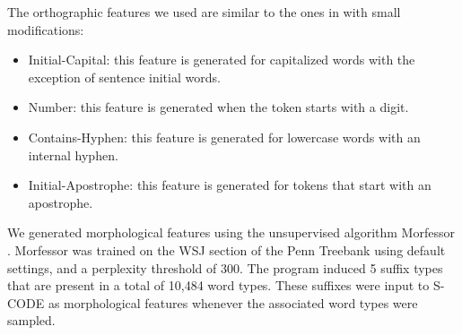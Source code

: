 \documentclass[11pt]{article}
\begin{document}




The orthographic features we used are similar to the ones in
\cite{bergkirkpatrick-EtAl:2010:NAACLHLT} with small modifications:

\begin{itemize}
\item Initial-Capital: this feature is generated for capitalized words
  with the exception of sentence initial words.
\item Number: this feature is generated when the token starts with a
  digit.
\item Contains-Hyphen: this feature is generated for lowercase words
  with an internal hyphen.
\item Initial-Apostrophe: this feature is generated for tokens that
  start with an apostrophe.
\end{itemize}

We generated morphological features using the unsupervised algorithm
Morfessor \cite{creutz05}.  Morfessor was trained on the WSJ section
of the Penn Treebank using default settings, and a perplexity
threshold of 300.  The program induced 5 suffix types that are present
in a total of 10,484 word types.  These suffixes were input to S-CODE
as morphological features whenever the associated word types were
sampled.
\end{document}
